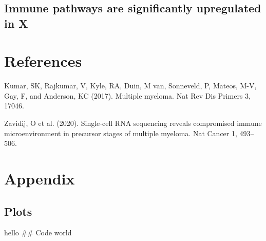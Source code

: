 \documentclass[
  parskip,
  oneside]{scrreprt}
\newlength{\cslhangindent}
\newlength{\cslentryspacingunit} %
\newenvironment{CSLReferences}[2] %
 {%
  \setlength{\parindent}{0pt}
  \ifodd #1
  \let\oldpar\par
  \def\par{\hangindent=\cslhangindent\oldpar}
  \fi
  \setlength{\parskip}{#2\cslentryspacingunit}
 }%
 {}
\begin{document}
\hypertarget{immune-pathways-are-significantly-upregulated-in-x}{%
\section{Immune pathways are significantly upregulated in
X}\label{immune-pathways-are-significantly-upregulated-in-x}}

\hypertarget{references}{%
\chapter{References}\label{references}}

\hypertarget{refs}{}
\begin{CSLReferences}{0}{0}
\leavevmode{}%
Kumar, SK, Rajkumar, V, Kyle, RA, Duin, M van, Sonneveld, P, Mateos,
M-V, Gay, F, and Anderson, KC (2017). Multiple myeloma. Nat Rev Dis
Primers 3, 17046.

\leavevmode{}%
Zavidij, O et al. (2020). Single-cell {RNA} sequencing reveals
compromised immune microenvironment in precursor stages of multiple
myeloma. Nat Cancer 1, 493--506.

\end{CSLReferences}

\hypertarget{appendix}{%
\chapter{Appendix}\label{appendix}}

\hypertarget{plots}{%
\section{Plots}\label{plots}}

hello \#\# Code world
\end{document}
